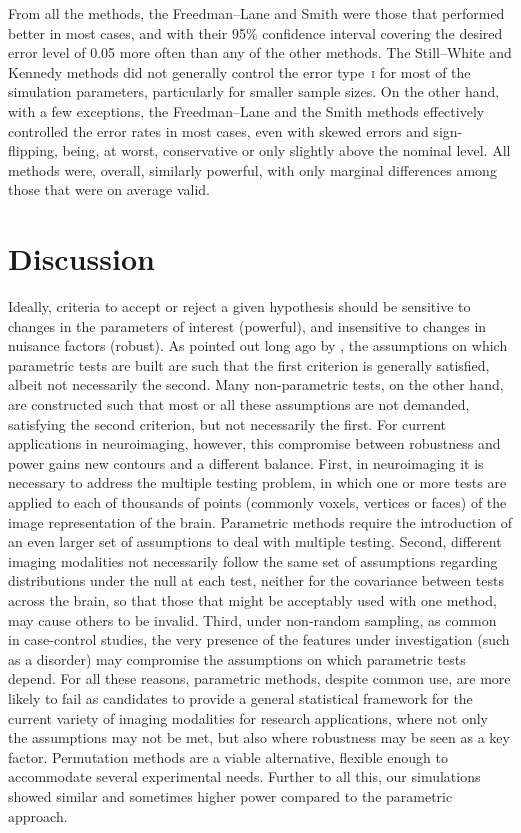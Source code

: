 \vspace{10pt}

From all the methods, the Freedman--Lane and Smith were those that performed better in most cases, and with their 95\% confidence interval covering the desired error level of 0.05 more often than any of the other methods. The Still--White and Kennedy methods did not generally control the error type~\textsc{i} for most of the simulation parameters, particularly for smaller sample sizes. On the other hand, with a few exceptions, the Freedman--Lane and the Smith methods effectively controlled the error rates in most cases, even with skewed errors and sign-flipping, being, at worst, conservative or only slightly above the nominal level. All methods were, overall, similarly powerful, with only marginal differences among those that were on average valid.

\section{Discussion}

Ideally, criteria to accept or reject a given hypothesis should be sensitive to changes in the parameters of interest (powerful), and insensitive to changes in nuisance factors (robust). As pointed out long ago by \citet{Box1955}, the assumptions on which parametric tests are built are such that the first criterion is generally satisfied, albeit not necessarily the second. Many non-parametric tests, on the other hand, are constructed such that most or all these assumptions are not demanded, satisfying the second criterion, but not necessarily the first. For current applications in neuroimaging, however, this compromise between robustness and power gains new contours and a different balance. First, in neuroimaging it is necessary to address the multiple testing problem, in which one or more tests are applied to each of thousands of points (commonly voxels, vertices or faces) of the image representation of the brain. Parametric methods require the introduction of an even larger set of assumptions to deal with multiple testing. Second, different imaging modalities not necessarily follow the same set of assumptions regarding distributions under the null at each test, neither for the covariance between tests across the brain, so that those that might be acceptably used with one method, may cause others to be invalid. Third, under non-random sampling, as common in case-control studies, the very presence of the features under investigation (such as a disorder) may compromise the assumptions on which parametric tests depend. For all these reasons, parametric methods, despite common use, are more likely to fail as candidates to provide a general statistical framework for the current variety of imaging modalities for research applications, where not only the assumptions may not be met, but also where robustness may be seen as a key factor. Permutation methods are a viable alternative, flexible enough to accommodate several experimental needs. Further to all this, our simulations showed similar and sometimes higher power compared to the parametric approach.

